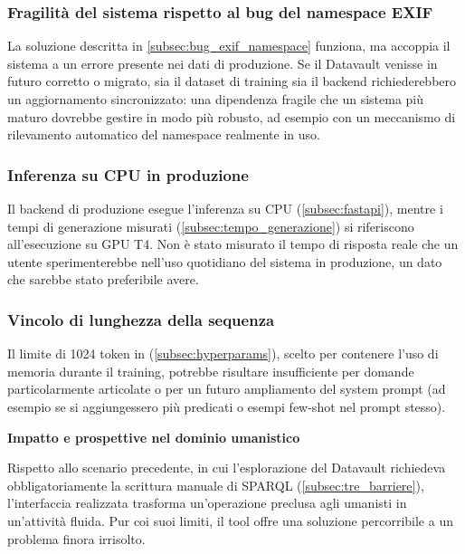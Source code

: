 \subsubsection{Fragilità del sistema rispetto al bug del namespace EXIF}

La soluzione descritta in \cref{subsec:bug_exif_namespace} funziona, ma accoppia il sistema a un errore presente nei dati di produzione. Se il Datavault venisse in futuro corretto o migrato, sia il dataset di training sia il backend richiederebbero un aggiornamento sincronizzato: una dipendenza fragile che un sistema più maturo dovrebbe gestire in modo più robusto, ad esempio con un meccanismo di rilevamento automatico del namespace realmente in uso.

\subsubsection{Inferenza su CPU in produzione}

Il backend di produzione esegue l'inferenza su CPU (\cref{subsec:fastapi}), mentre i tempi di generazione misurati (\cref{subsec:tempo_generazione}) si riferiscono all'esecuzione su GPU T4. Non è stato misurato il tempo di risposta reale che un utente sperimenterebbe nell'uso quotidiano del sistema in produzione, un dato che sarebbe stato preferibile avere.

\subsubsection{Vincolo di lunghezza della sequenza}

Il limite di 1024 token in  (\cref{subsec:hyperparams}), scelto per contenere l'uso di memoria durante il training, potrebbe risultare insufficiente per domande particolarmente articolate o per un futuro ampliamento del system prompt (ad esempio se si aggiungessero più predicati o esempi few-shot nel prompt stesso).

\textbf{Impatto e prospettive nel dominio umanistico}\label{subsec:giustificazione}

Rispetto allo scenario precedente, in cui l'esplorazione del Datavault richiedeva obbligatoriamente la scrittura manuale di SPARQL (\cref{subsec:tre_barriere}), l'interfaccia realizzata trasforma un'operazione preclusa agli umanisti in un'attività fluida. Pur coi suoi limiti, il tool offre una soluzione percorribile a un problema finora irrisolto.


